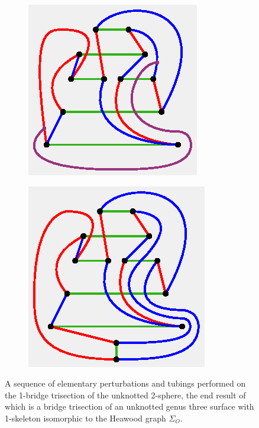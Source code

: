 \documentclass[11pt, oneside]{amsart}
\theoremstyle{theorem}
\theoremstyle{definition}
\theoremstyle{theorem}
\begin{document}
\begin{figure}[h!]
\begin{subfigure}{.24\textwidth}
  \centering
  \includegraphics[width=.9\linewidth]{hbt6.eps}
  \label{oxb6}
\end{subfigure}
\begin{subfigure}{.24\textwidth}
  \centering
  \includegraphics[width=.9\linewidth]{hbt7.eps}
  \label{oxb7}
\end{subfigure}%
\caption{A sequence of elementary perturbations and tubings performed on the 1-bridge trisection of the unknotted 2-sphere, the end result of which is a bridge trisection of an unknotted genus three surface with 1-skeleton isomorphic to the Heawood graph $\Sigma_O$.}
\label{oxb}
\end{figure}
\end{document}
